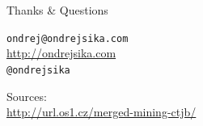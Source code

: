 \documentclass{beamer}
\begin{document}
\begin{frame}

    {\Huge Thanks \& Questions}\\

    \vspace{1cm}

    \texttt{ondrej@ondrejsika.com}\\
    \url{http://ondrejsika.com}\\
    \texttt{@ondrejsika}\\

    \vspace{1cm}

    Sources:\\
    \url{http://url.os1.cz/merged-mining-ctjb/}
\end{frame}
\end{document}
